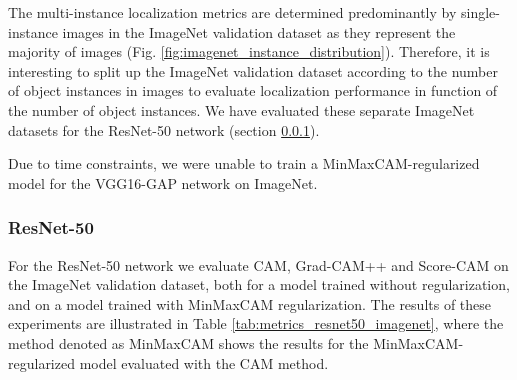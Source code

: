 The multi-instance localization metrics are determined predominantly by single-instance images in the ImageNet validation dataset as they represent the majority of images (Fig. \ref{fig:imagenet_instance_distribution}). Therefore, it is interesting to split up the ImageNet validation dataset according to the number of object instances in images to evaluate localization performance in function of the number of object instances. We have evaluated these separate ImageNet datasets for the ResNet-50 network (section \ref{sec:exp_resnet50_imagenet}).

Due to time constraints, we were unable to train a MinMaxCAM-regularized model for the VGG16-GAP network on ImageNet.

\subsubsection{ResNet-50} \label{sec:exp_resnet50_imagenet}

For the ResNet-50 network we evaluate CAM, Grad-CAM++ and Score-CAM on the ImageNet validation dataset, both for a model trained without regularization, and on a model trained with MinMaxCAM regularization. The results of these experiments are illustrated in Table \ref{tab:metrics_resnet50_imagenet}, where the method denoted as MinMaxCAM shows the results for the MinMaxCAM-regularized model evaluated with the CAM method. 

